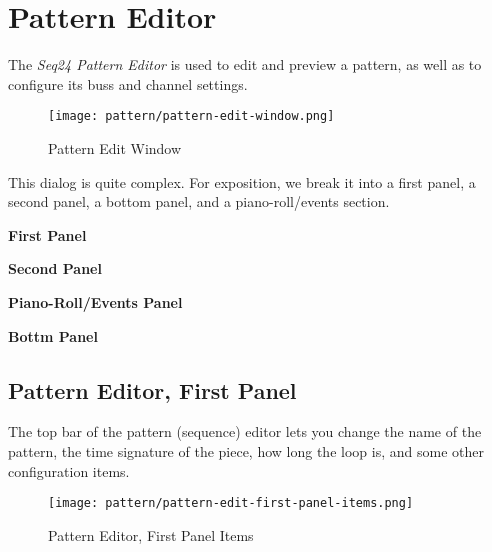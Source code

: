 %
%
%

\section{Pattern Editor}
\label{sec:seq24_pattern_editor}

   The \textsl{Seq24 Pattern Editor} is used to edit and preview a pattern,
   as well as to configure its buss and channel settings.

\begin{figure}[H]
   \centering 
   \texttt{[image: pattern/pattern-edit-window.png]}
   \caption{Pattern Edit Window}
   \label{fig:pattern_edit_window}
\end{figure}

   This dialog is quite complex.
   For exposition, we break it into a first panel, a second panel, a
   bottom panel, and a piano-roll/events section.

   \begin{enumber}
      \item \textbf{First Panel}
      \item \textbf{Second Panel}
      \item \textbf{Piano-Roll/Events Panel}
      \item \textbf{Bottm Panel}
   \end{enumber}

\subsection{Pattern Editor, First Panel}
\label{subsec:seq24_pattern_editor_first}

   The top bar of the pattern (sequence) editor lets you change the name of
   the pattern, the time signature of the piece, how long the loop is, and
   some other configuration items.

\begin{figure}[H]
   \centering 
   \texttt{[image: pattern/pattern-edit-first-panel-items.png]}
   \caption{Pattern Editor, First Panel Items}
   \label{fig:pattern_editor_first_panel_items}
\end{figure}

